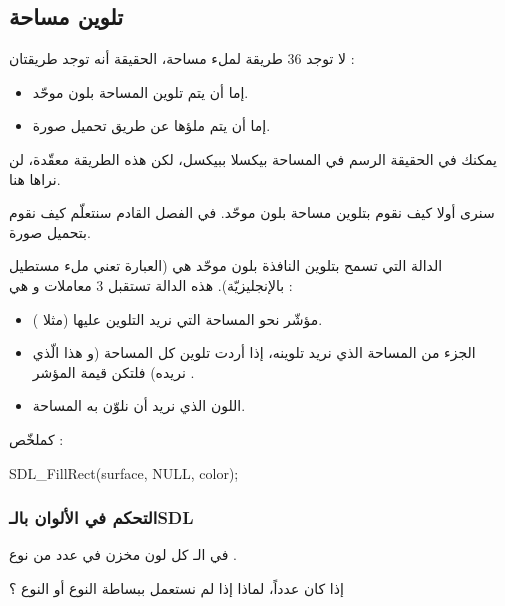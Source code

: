 \subsection{تلوين مساحة}

لا توجد 36 طريقة لملء مساحة، الحقيقة أنه توجد طريقتان :

\begin{itemize}
	\item إما أن يتم تلوين المساحة بلون موحّد.
	\item إما أن يتم ملؤها عن طريق تحميل صورة.
\end{itemize}

\begin{information}
يمكنك في الحقيقة الرسم في المساحة بيكسلا ببيكسل، لكن هذه الطريقة معقّدة، لن نراها هنا.
\end{information}

سنرى أولا كيف نقوم بتلوين مساحة بلون موحّد. في الفصل القادم سنتعلّم كيف نقوم بتحميل صورة.

الدالة التي تسمح بتلوين النافذة بلون موحّد هي
(العبارة 
تعني ملء مستطيل بالإنجليزيّة). هذه الدالة تستقبل 3 معاملات و هي :

\begin{itemize}
	\item مؤشّر نحو المساحة التي نريد التلوين عليها (مثلا
	).
	\item الجزء من المساحة الذي نريد تلوينه، إذا أردت تلوين كل المساحة (و هذا الّذي نريده) فلتكن قيمة المؤشر 
	.
	\item اللون الذي نريد أن نلوّن به المساحة.
\end{itemize}

كملخّص :

\begin{Csource}
SDL_FillRect(surface, NULL, color);
\end{Csource}

\subsubsection{التحكم في الألوان بالـ\textenglish{SDL}}

في الـ
كل لون مخزن في عدد من نوع
.

\begin{question}
إذا كان عدداً، لماذا إذا لم نستعمل ببساطة النوع
أو النوع
 ؟
\end{question}

